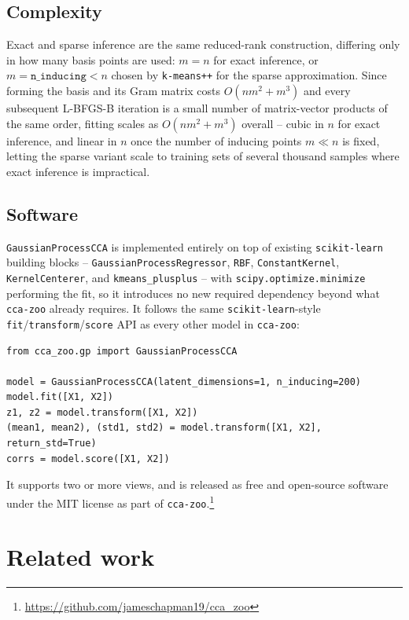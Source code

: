 \documentclass[11pt]{article}
\begin{document}
\subsection{Complexity}

Exact and sparse inference are the same reduced-rank construction, differing only in how many basis points are used: $m = n$ for exact inference, or $m = \texttt{n\_inducing} < n$ chosen by \texttt{k-means++} for the sparse approximation. Since forming the basis and its Gram matrix costs $O(nm^2 + m^3)$ and every subsequent L-BFGS-B iteration is a small number of matrix-vector products of the same order, fitting scales as $O(nm^2 + m^3)$ overall -- cubic in $n$ for exact inference, and linear in $n$ once the number of inducing points $m \ll n$ is fixed, letting the sparse variant scale to training sets of several thousand samples where exact inference is impractical.

\subsection{Software}

\texttt{GaussianProcessCCA} is implemented entirely on top of existing \texttt{scikit-learn} \citep{pedregosa2011scikit} building blocks -- \texttt{GaussianProcessRegressor}, \texttt{RBF}, \texttt{ConstantKernel}, \texttt{KernelCenterer}, and \texttt{kmeans\_plusplus} -- with \texttt{scipy.optimize.minimize} performing the fit, so it introduces no new required dependency beyond what \texttt{cca-zoo} already requires. It follows the same \texttt{scikit-learn}-style \texttt{fit}/\texttt{transform}/\texttt{score} API as every other model in \texttt{cca-zoo}:
\begin{verbatim}
from cca_zoo.gp import GaussianProcessCCA

model = GaussianProcessCCA(latent_dimensions=1, n_inducing=200)
model.fit([X1, X2])
z1, z2 = model.transform([X1, X2])
(mean1, mean2), (std1, std2) = model.transform([X1, X2], return_std=True)
corrs = model.score([X1, X2])
\end{verbatim}
It supports two or more views, and is released as free and open-source software under the MIT license as part of \texttt{cca-zoo}.\footnote{\url{https://github.com/jameschapman19/cca_zoo}}

\section{Related work}
\end{document}
